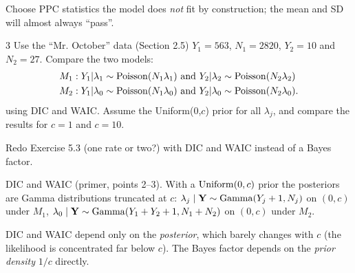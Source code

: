 \documentclass[11pt]{article}
\begin{document}
\begin{takeaway}
Choose PPC statistics the model does \emph{not} fit by construction; the mean and SD will almost always ``pass''.
\end{takeaway}


\begin{problem}{3}
Use the ``Mr. October'' data (Section 2.5) $Y_1=563$, $N_1=2820$, $Y_2=10$ and $N_2=27$. Compare the two models:
\begin{align*}
M_1&: Y_1|\lambda_1\sim\dist{Poisson}(N_1\lambda_1)\ \text{and}\ Y_2|\lambda_2\sim\dist{Poisson}(N_2\lambda_2)\\
M_2&: Y_1|\lambda_0\sim\dist{Poisson}(N_1\lambda_0)\ \text{and}\ Y_2|\lambda_0\sim\dist{Poisson}(N_2\lambda_0).
\end{align*}
using DIC and WAIC. Assume the Uniform(0,$c$) prior for all $\lambda_j$, and compare the results for $c=1$ and $c=10$.
\end{problem}

\begin{restate}
Redo Exercise 5.3 (one rate or two?) with DIC and WAIC instead of a Bayes factor.
\end{restate}

\begin{recall}
DIC and WAIC (primer, points 2--3). With a $\mathrm{Uniform}(0,c)$ prior the posteriors are Gamma distributions truncated at $c$: $\lambda_j\mid\mathbf Y\sim\mathrm{Gamma}(Y_j+1,N_j)$ on $(0,c)$ under $M_1$, $\lambda_0\mid\mathbf Y\sim\mathrm{Gamma}(Y_1+Y_2+1,N_1+N_2)$ on $(0,c)$ under $M_2$.
\end{recall}

\begin{keyidea}
DIC and WAIC depend only on the \emph{posterior}, which barely changes with $c$ (the likelihood is concentrated far below $c$). The Bayes factor depends on the \emph{prior density} $1/c$ directly.
\end{keyidea}
\end{document}
